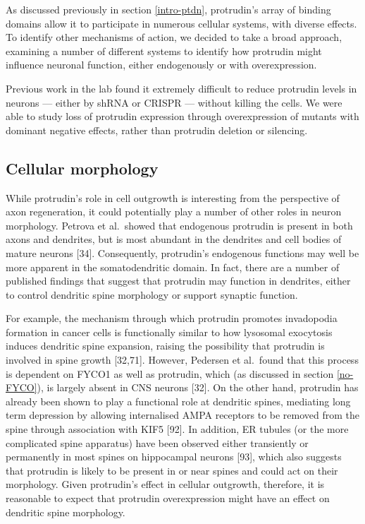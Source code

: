 \documentclass[
  12pt,
  a4paper,
]{book}
\begin{document}
As discussed previously in section \ref{intro-ptdn}, protrudin's array of binding domains allow it to participate in numerous cellular systems, with diverse effects. To identify other mechanisms of action, we decided to take a broad approach, examining a number of different systems to identify how protrudin might influence neuronal function, either endogenously or with overexpression.

Previous work in the lab found it extremely difficult to reduce protrudin levels in neurons --- either by shRNA or CRISPR --- without killing the cells. We were able to study loss of protrudin expression through overexpression of mutants with dominant negative effects, rather than protrudin deletion or silencing.

\hypertarget{cellular-morphology}{%
\subsection{Cellular morphology}\label{cellular-morphology}}

While protrudin's role in cell outgrowth is interesting from the perspective of axon regeneration, it could potentially play a number of other roles in neuron morphology. Petrova et al.~showed that endogenous protrudin is present in both axons and dendrites, but is most abundant in the dendrites and cell bodies of mature neurons {[}34{]}. Consequently, protrudin's endogenous functions may well be more apparent in the somatodendritic domain. In fact, there are a number of published findings that suggest that protrudin may function in dendrites, either to control dendritic spine morphology or support synaptic function.

For example, the mechanism through which protrudin promotes invadopodia formation in cancer cells is functionally similar to how lysosomal exocytosis induces dendritic spine expansion, raising the possibility that protrudin is involved in spine growth {[}32,71{]}. However, Pedersen et al.~found that this process is dependent on FYCO1 as well as protrudin, which (as discussed in section \ref{no-FYCO}), is largely absent in CNS neurons {[}32{]}. On the other hand, protrudin has already been shown to play a functional role at dendritic spines, mediating long term depression by allowing internalised AMPA receptors to be removed from the spine through association with KIF5 {[}92{]}. In addition, ER tubules (or the more complicated spine apparatus) have been observed either transiently or permanently in most spines on hippocampal neurons {[}93{]}, which also suggests that protrudin is likely to be present in or near spines and could act on their morphology. Given protrudin's effect in cellular outgrowth, therefore, it is reasonable to expect that protrudin overexpression might have an effect on dendritic spine morphology.
\end{document}
